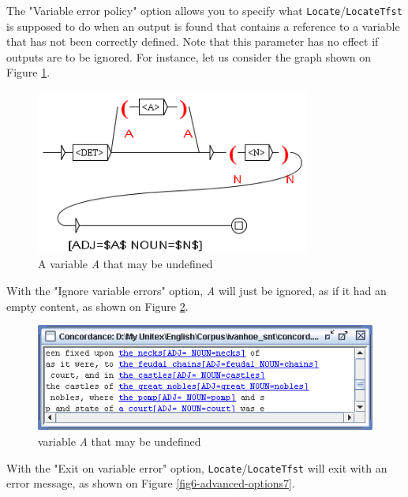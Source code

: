 \bigskip
\noindent The "Variable error policy" option allows you to specify what
\verb+Locate+/\verb+LocateTfst+ is supposed to do when an output is found that
contains a reference to a variable that has not been correctly defined. Note
that this parameter has no effect if outputs are to be ignored. 
For instance, let us consider the graph shown on Figure
\ref{fig6-advanced-options5}. 

\bigskip
\begin{figure}[!h]
\begin{center}
\includegraphics[width=9cm]{resources/img/fig6-advanced-options5.png}
\caption{A variable \textit{A} that may be
undefined\label{fig6-advanced-options5}}
\end{center}
\end{figure}

\noindent With the "Ignore variable errors" option, \textit{A} will just be
ignored, as if it had an empty content, as shown on Figure
\ref{fig6-advanced-options6}. 

\bigskip
\begin{figure}[!h]
\begin{center}
\includegraphics[width=12cm]{resources/img/fig6-advanced-options6.png}
\caption{
 variable \textit{A} that may be
undefined\label{fig6-advanced-options6}}
\end{center}
\end{figure}


\noindent With the "Exit on variable error" option, \verb+Locate+/\verb+LocateTfst+
will exit with an error message, as shown on Figure
\ref{fig6-advanced-options7}.

